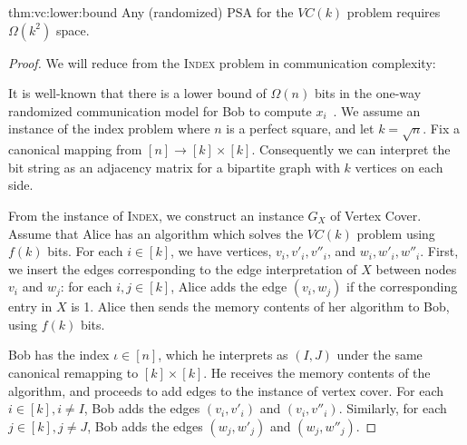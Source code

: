 \documentclass[11pt,letter]{article}
\newcommand{\COMMENTED}[1]{{}}
\newcommand{\junk}[1]{\COMMENTED{#1}}
\begin{document}
\begin{reptheorem}{thm:vc:lower:bound}
Any (randomized) PSA for the $VC(k)$ problem requires $\Omega(k^2)$ space.
\label{thm:lower-bound-vc}
\end{reptheorem}
\begin{proof}

We will reduce from the \textsc{Index} problem in communication complexity:

\begin{center}\end{center}

It is well-known that there is a lower bound of $\Omega(n)$ bits
in the one-way randomized communication model for Bob to compute $x_i$~\cite{nisan}.
We assume an instance of the index problem where $n$ is a perfect
square, and let $k=\sqrt{n}$. Fix a canonical mapping from $[n]\rightarrow [k] \times
[k]$.
Consequently we can interpret the bit string as an adjacency matrix for a
bipartite graph with $k$ vertices on each side.

From the instance of \textsc{Index}, we construct an instance $G_X$
of Vertex Cover.
Assume that Alice has an algorithm which solves the $VC(k)$ problem
using $f(k)$ bits.
For each $i \in [k]$, we have vertices,
$v_i,v'_i, v''_i$, and $w_i, w'_i, w''_i$.
First, we insert the edges corresponding to the edge interpretation of
$X$ between nodes $v_i$ and $w_j$:
  for each $i, j \in [k]$, Alice adds the edge $(v_i, w_j)$ if
  the corresponding entry in $X$ is 1.
Alice then sends the memory contents of her algorithm to Bob, using
$f(k)$ bits.

Bob has the index $\iota \in [n]$, which he interprets as $(I,J)$ under
the same canonical remapping to $[k] \times [k]$.
He receives the memory contents of the algorithm, and proceeds to add
edges to the instance of vertex cover.
For each $i \in [k], i \neq I$, Bob adds the edges $(v_i,
v'_i)$ and $(v_i, v''_i)$.
Similarly, for each $j \in [k], j \neq J$, Bob adds the edges
$(w_j, w'_j)$ and $(w_j, w''_j)$.




\junk{
It follows that there is a lower bound of $\Omega(k^2)$ bits for Bob
to compute the matrix entry $M_{I,J}$. The next theorem shows that
if there is a single pass streaming algorithm, say $\mathcal{A}$,
which solves the $VC(k)$ problem in $f(k)$ space,
then there is a protocol for the \textsc{Matrix Index} instance with $f(k)$ bits.
Hence the lower bound of $\Omega(k^2)$ transfers to the $VC(k)$ problem as well.

}
\end{proof}
\end{document}

